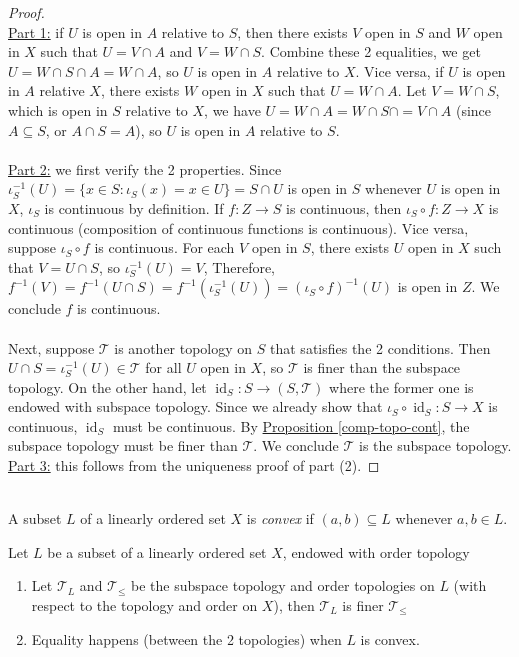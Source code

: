 \documentclass{treatise}
\begin{document}
\begin{proof} \ \\
\underline{Part 1:} if $U$ is open in $A$ relative to $S$, then there exists $V$ open in $S$ and $W$ open in $X$ such that $U = V \cap A$ and $V = W \cap S$. Combine these 2 equalities, we get $U = W \cap S \cap A = W \cap A$, so $U$ is open in $A$ relative to $X$. Vice versa, if $U$ is open in $A$ relative $X$, there exists $W$ open in $X$ such that $U = W \cap A$. Let $V = W \cap S$, which is open in $S$ relative to $X$, we have $U = W \cap A = W \cap S \cap = V \cap A$ (since $A \subseteq S$, or $A \cap S = A$), so $U$ is open in $A$ relative to $S$.
\\
\\
\underline{Part 2:} we first verify the 2 properties. Since $\iota_S^{-1}(U) = \{ x \in S : \iota_S (x) = x \in U \} = S \cap U$ is open in $S$ whenever $U$ is open in $X$, $\iota_S$ is continuous by definition. If $f: Z \to S$ is continuous, then $\iota_S \circ f: Z \to X$ is continuous (composition of continuous functions is continuous). Vice versa, suppose $\iota_S \circ f$ is continuous. For each $V$ open in $S$, there exists $U$ open in $X$ such that $V = U \cap S$, so $\iota_S^{-1}(U) = V$, Therefore, $f^{-1}(V) = f^{-1}(U \cap S) = f^{-1}(\iota_S^{-1}(U)) = (\iota_S \circ f)^{-1}(U)$ is open in $Z$. We conclude $f$ is continuous.
\\
\\
Next, suppose $\mathcal{T}$ is another topology on $S$ that satisfies the 2 conditions. Then $U \cap S = \iota_S^{-1}(U) \in \mathcal{T}$ for all $U$ open in $X$, so $\mathcal{T}$ is finer than the subspace topology. On the other hand, let $\operatorname{id}_S: S \to (S, \mathcal{T})$ where the former one is endowed with subspace topology. Since we already show that $\iota_S \circ \operatorname{id}_S: S \to X$ is continuous, $\operatorname{id}_S$ must be continuous. By \hyperref[comp-topo-cont]{Proposition \ref*{comp-topo-cont}}, the subspace topology must be finer than $\mathcal{T}$. We conclude $\mathcal{T}$ is the subspace topology.
\\
\underline{Part 3:} this follows from the uniqueness proof of part (2).
\end{proof}
\ \\
A subset $L$ of a linearly ordered set $X$ is \emph{convex} if $(a, b) \subseteq L$ whenever $a, b \in L$.
\begin{proposition}
Let $L$ be a subset of a linearly ordered set $X$, endowed with order topology
\begin{enumerate}
    \item Let $\mathcal{T}_L$ and $\mathcal{T}_{\leq}$ be the subspace topology and order topologies on $L$ (with respect to the topology and order on $X$), then $\mathcal{T}_L$ is finer $\mathcal{T}_{\leq}$
    \item Equality happens (between the 2 topologies) when $L$ is convex.
\end{enumerate}
\end{proposition}
\end{document}
